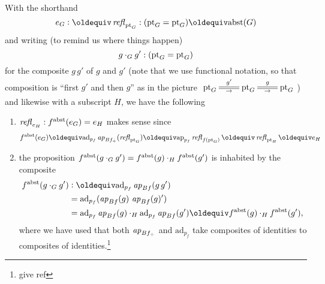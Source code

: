 \begin{definition}

With the shorthand $$e_G\defequi\refl{\pt_G}:(\pt_G=\pt_G)\oldequiv\abstr(G)$$ and writing (to remind us where things happen)
$$g\cdot_Gg':({\mathord{\mathrm{pt}}}_G={\mathord{\mathrm{pt}}}_G)$$
 for the composite $g\,g'$ of $g$ and $g'$ (note that we use functional notation, so that composition is ``first $g'$ and then $g$'' as in the picture 
$\xymatrix{\pt_G\ar@{=}[r]^{g'}_\to&\pt_G\ar@{=}[r]^{g}_\to&\pt_G}$) %
and likewise with a subscript $H$, we have the following
  \begin{enumerate}
  \item $\mathop{{\it refl}_{e_H}}:f^{\mathrm{abst}}(e_G)= e_H$ makes sense since
$$f^\abstr(e_G)\oldequiv\mathrm{ad}_{p_f}\ap{Bf_\div}(\refl{\pt_G})\oldequiv\mathrm{ap}_{p_f}\refl{f(\pt_G)}\oldequiv\refl{\pt_H}\oldequiv e_H
$$
      \item the proposition $f^{\mathrm{abst}}(g\cdot_Gg')=f^{\mathrm{abst}}(g)\cdot_Hf^{\mathrm{abst}}(g')$ is inhabited by the composite
        \begin{align*}
          f^\abstr(g\cdot_Gg')&\defequi %
            \mathrm{ad}_{p_f}\ap{Bf}(g\, g')\\
          &=\mathrm{ad}_{p_f}(\ap{Bf}(g)\,\ap{Bf}(g)')\\
          &=\mathrm{ad}_{p_f}\ap{Bf}(g)\cdot_H\mathrm{ad}_{p_f}\ap{Bf}(g')\oldequiv f^\abstr(g)\cdot_Hf^\abstr(g'),
        \end{align*}
where we have used that both $\mathop{{\it ap}_{Bf_\div}}$ and $\mathrm{ad}_{p_f}$ take composites of identities to composites of identities.\footnote{give ref}


\end{enumerate}
\end{definition}

